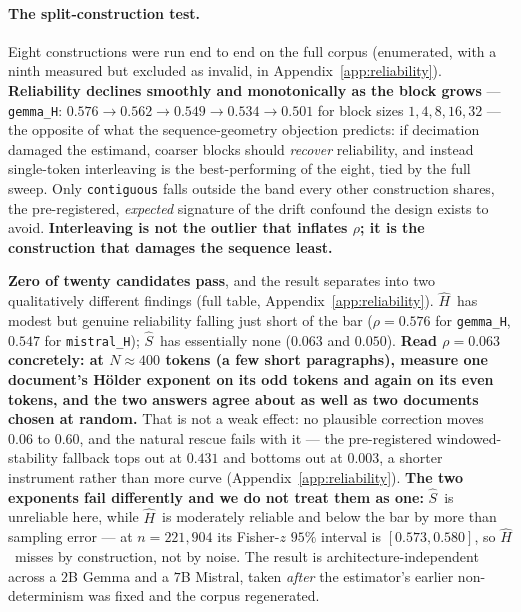 \documentclass{article}
\newcommand{\Sest}{\ensuremath{\widehat{S}}}
\newcommand{\Hest}{\ensuremath{\widehat{H}}}
\begin{document}
\paragraph{The split-construction test.} Eight constructions were run end to
end on the full corpus (enumerated, with a ninth measured but excluded as
invalid, in Appendix~\ref{app:reliability}).
\textbf{Reliability declines smoothly and monotonically as the block grows}
--- \texttt{gemma\_H}: $0.576\to0.562\to0.549\to0.534\to0.501$ for block sizes
$1,4,8,16,32$ --- the opposite of what the sequence-geometry objection
predicts: if decimation damaged the estimand, coarser blocks should
\emph{recover} reliability, and instead single-token interleaving is the
best-performing of the eight, tied by the full sweep. Only \texttt{contiguous} falls
outside the band every other construction shares, the pre-registered,
\emph{expected} signature of the drift confound the design exists to avoid.
\textbf{Interleaving is not the outlier that inflates $\rho$; it is the
construction that damages the sequence least.}

\textbf{Zero of twenty candidates pass}, and the result separates into two
qualitatively different findings (full table, Appendix~\ref{app:reliability}).
\Hest\ has modest but genuine reliability falling just short of the bar
($\rho=0.576$ for \texttt{gemma\_H}, $0.547$ for \texttt{mistral\_H}); \Sest\ has
essentially none ($0.063$ and $0.050$). \textbf{Read $\rho=0.063$ concretely:
at $N\!\approx\!400$ tokens (a few short paragraphs), measure one document's
H\"older exponent on its odd tokens and again on its even tokens, and the two
answers agree about as well as two documents chosen at random.} That is not a weak effect: no plausible
correction moves $0.06$ to $0.60$, and the natural rescue fails with it --- the
pre-registered windowed-stability fallback tops out at $0.431$ and bottoms out
at $0.003$, a shorter instrument rather than more curve
(Appendix~\ref{app:reliability}). \textbf{The two exponents fail differently
and we do not treat them as one:} \Sest\ is unreliable here, while \Hest\ is
moderately reliable and below the bar by more than sampling error --- at
$n=221{,}904$ its Fisher-$z$ $95\%$ interval is $[0.573,0.580]$, so \Hest\ misses
by construction, not by noise. The result is architecture-independent across a
$2$B Gemma and a $7$B Mistral, taken \emph{after} the estimator's earlier
non-determinism was fixed and the corpus regenerated.
\end{document}

